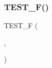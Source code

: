 \subsubsection{\texorpdfstring{TEST\_F()}{TEST\_F()}}
{\footnotesize\ttfamily T\+E\+S\+T\+\_\+F (\begin{DoxyParamCaption}\item[{\mbox{\hyperlink{googletest-master_2googletest_2test_2gtest__prod__test_8cc_a89debba10c803e339ce0f9b0b34a2267}{Private\+Code\+Fixture\+Test}}}]{,  }\item[{Can\+Access\+Private\+Members}]{ }\end{DoxyParamCaption})}

